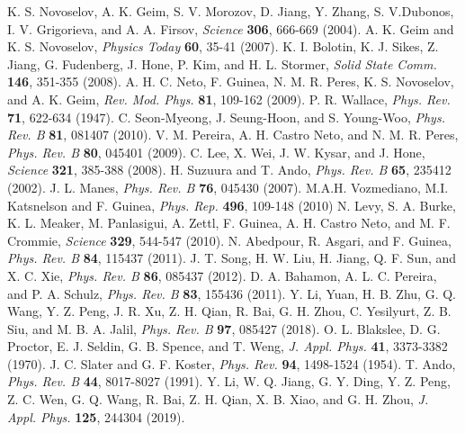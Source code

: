 \documentclass[reprint,amsmath,amssymb,aps,superscriptaddress]{revtex4-2}
\begin{document}
\begin{thebibliography}{99}
K. S. Novoselov,  A. K. Geim, S. V.  Morozov, D. Jiang, Y. Zhang, S. V.Dubonos, I. V. Grigorieva, and A. A. Firsov, \textit{Science} {\bf 306}, 666-669 (2004).
A. K. Geim and K. S. Novoselov, \textit{Physics Today} {\bf 60}, 35-41 (2007).
K. I. Bolotin, K. J. Sikes, Z. Jiang, G. Fudenberg, J. Hone, P. Kim, and H. L. Stormer, \textit{Solid State Comm.} {\bf 146}, 351-355 (2008).
A. H. C. Neto, F. Guinea, N. M. R. Peres, K. S. Novoselov, and A. K. Geim, \textit{Rev. Mod. Phys.} {\bf 81}, 109-162 (2009).
P. R. Wallace, \textit{Phys. Rev.} {\bf 71}, 622-634 (1947).
C. Seon-Myeong, J. Seung-Hoon, and S. Young-Woo, \textit{Phys. Rev. B} {\bf 81}, 081407 (2010).
V. M. Pereira, A. H. Castro Neto, and N. M. R. Peres, \textit{Phys. Rev. B} {\bf 80}, 045401 (2009).
C. Lee, X. Wei, J. W. Kysar, and J. Hone, \textit{Science} {\bf 321}, 385-388 (2008).
H. Suzuura and T. Ando, \textit{Phys. Rev. B} {\bf 65}, 235412 (2002).
J. L. Manes, \textit{Phys. Rev. B} {\bf 76}, 045430 (2007).
M.A.H. Vozmediano, M.I. Katsnelson and F. Guinea, \textit{Phys. Rep.} {\bf 496}, 109-148 (2010)
N. Levy, S. A. Burke, K. L. Meaker, M. Panlasigui, A. Zettl, F. Guinea, A. H. Castro Neto, and M. F. Crommie, \textit{Science} {\bf 329}, 544-547 (2010).
N. Abedpour, R. Asgari, and F. Guinea, \textit{Phys. Rev. B} {\bf 84}, 115437 (2011).
J. T. Song, H. W. Liu, H. Jiang, Q. F. Sun, and X. C. Xie, \textit{Phys. Rev. B} {\bf 86}, 085437 (2012).
D. A. Bahamon, A. L. C. Pereira, and P. A. Schulz, \textit{Phys. Rev. B} {\bf 83}, 155436 (2011).
Y. Li, Yuan, H. B. Zhu, G. Q. Wang, Y. Z. Peng, J. R. Xu, Z. H. Qian, R. Bai, G. H. Zhou, C. Yesilyurt, Z. B. Siu, and M. B. A. Jalil, \textit{Phys. Rev. B} {\bf 97}, 085427 (2018).
O. L. Blakslee, D. G. Proctor, E. J. Seldin, G. B. Spence, and T. Weng, \textit{J. Appl. Phys.} {\bf 41}, 3373-3382 (1970).
 J. C. Slater and G. F. Koster, \textit{Phys. Rev.} {\bf 94}, 1498-1524 (1954).
T. Ando, \textit{Phys. Rev. B} {\bf 44}, 8017-8027 (1991).
Y. Li, W. Q. Jiang, G. Y. Ding, Y. Z. Peng, Z. C. Wen, G. Q. Wang, R. Bai, Z. H. Qian, X. B. Xiao, and G. H. Zhou, \textit{J. Appl. Phys.} {\bf 125}, 244304 (2019).

\end{thebibliography}
\end{document}
